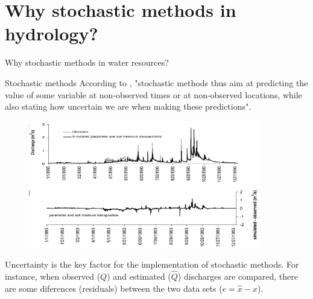 \documentclass[8pt]{beamer}
\begin{document}
\section{Why stochastic methods in hydrology?}
\begin{frame}{Why stochastic methods in water resources?}

    \begin{block}{Stochastic methods}
    According to \cite{}, "stochastic methods thus aim at predicting the value of some variable at non-observed times or at non-observed locations, while also stating how uncertain we are when making these predictions".
    \begin{figure}
    \centering
    \includegraphics[width=0.9\textwidth]{fi4l1.png}
    \end{figure}
    \vspace{-0.5cm}
    \alert{Uncertainty} is the key factor for the implementation of stochastic methods.  For instance, when observed ($Q$) and estimated ($\hat{Q}$) discharges are compared, there are some diferences (\alert{residuals}) between the two data sets ($e = \hat{x}-x$). 
\end{block}
\end{frame}
\end{document}
